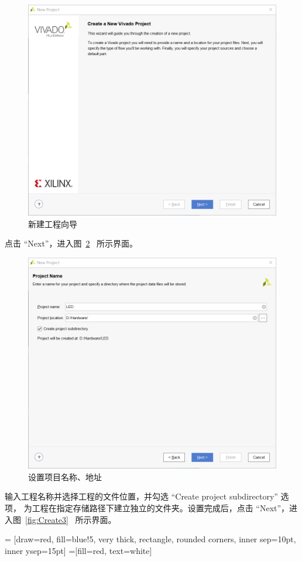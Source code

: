 \documentclass[ichigo,normal,cn]{elegantnote_mod}
\begin{document}
\begin{figure}[!htbp]
    \centering
    \includegraphics[width=.8\textwidth]{fig/Create1}
    \caption{新建工程向导}
    \label{fig:Create1}
\end{figure}

点击 ``Next''，进入图~\ref{fig:Create2}~ 所示界面。

\begin{figure}[!htbp]
    \centering
    \includegraphics[width=.8\textwidth]{fig/Create2}
    \caption{设置项目名称、地址}
    \label{fig:Create2}
\end{figure}

输入工程名称并选择工程的文件位置，并勾选 ``Create project subdirectory'' 选项，
为工程在指定存储路径下建立独立的文件夹。设置完成后，点击 ``Next''，进入图~\ref{fig:Create3}~ 所示界面。

 = [draw=red, fill=blue!5, very thick,
    rectangle, rounded corners, inner sep=10pt, inner ysep=15pt]
 =[fill=red, text=white]
\end{document}
